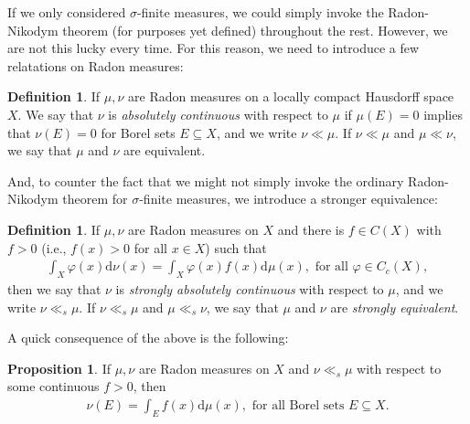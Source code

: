 \documentclass[10pt,twoside,openany,final]{memoir}
\theoremstyle{definition}
\newtheorem{proposition}[theorem]{Proposition}
\newtheorem{definition}[theorem]{Definition}
\theoremstyle{Break}
\renewcommand{\d}{\mathrm{d}}
\begin{document}
If we only considered $\sigma$-finite measures, we could simply invoke the Radon-Nikodym theorem (for purposes yet defined) throughout the rest. However, we are not this lucky every time. For this reason, we need to introduce a few relatations on Radon measures:
\begin{definition}
	If $\mu,\nu$ are Radon measures on a locally compact Hausdorff space $X$. We say that $\nu$ is \emph{absolutely continuous} with respect to $\mu$ if $\mu(E)=0$ implies that $\nu(E)=0$ for  Borel sets $E \subseteq X$, and we write $\nu \ll \mu$. If $\nu \ll \mu$ and $\mu \ll \nu$, we say that $\mu$ and $\nu$ are equivalent.
\end{definition}
And, to counter the fact that we might not simply invoke the ordinary Radon-Nikodym theorem for $\sigma$-finite measures, we introduce a stronger equivalence:
\begin{definition}
	If $\mu,\nu$ are Radon measures on $X$ and there is $f \in C(X)$ with $f>0$ (i.e., $f(x)>0$ for all $x \in X$) such that 
	\begin{align*}
		\int_X \varphi(x) \d \nu(x) = \int_X \varphi(x) f(x) \d \mu(x), \text{ for all } \varphi \in C_c(X),
	\end{align*}
	then we say that $\nu$ is \emph{strongly absolutely continuous} with respect to $\mu$, and we write $\nu \ll_s \mu$. If $\nu \ll_s \mu$ and $\mu \ll_s \nu$, we say that $\mu$ and $\nu$ are \emph{strongly equivalent}.
\end{definition}
A quick consequence of the above is the following:
\begin{proposition}
	If $\mu,\nu$ are Radon measures on $X$ and $\nu \ll_s \mu$ with respect to some continuous $f>0$, then 
	\begin{align*}
		\nu(E)=\int_E f(x) \d \mu(x), \text{ for all Borel sets } E \subseteq X.
	\end{align*}
\end{proposition}
\end{document}
